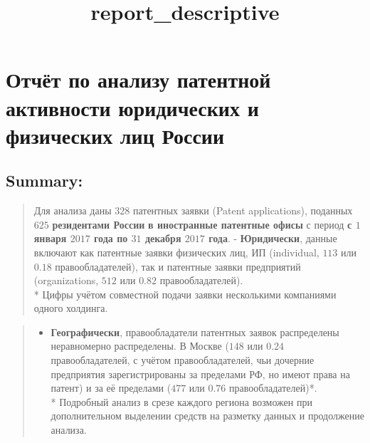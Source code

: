 \documentclass[11pt]{article}
\title{report\_descriptive}
\providecommand{\tightlist}{%
      \setlength{\itemsep}{0pt}\setlength{\parskip}{0pt}}
\begin{document}
    
    
    \maketitle
    
    

    
    \section{Отчёт по анализу патентной активности юридических и физических
лиц
России}\label{ux43eux442ux447ux451ux442-ux43fux43e-ux430ux43dux430ux43bux438ux437ux443-ux43fux430ux442ux435ux43dux442ux43dux43eux439-ux430ux43aux442ux438ux432ux43dux43eux441ux442ux438-ux44eux440ux438ux434ux438ux447ux435ux441ux43aux438ux445-ux438-ux444ux438ux437ux438ux447ux435ux441ux43aux438ux445-ux43bux438ux446-ux440ux43eux441ux441ux438ux438}

    \subsection{Summary:}\label{summary}

    \begin{quote}
Для анализа даны \textbf{\(328\)} патентных заявки (Patent
applications), поданных \(625\) \textbf{резидентами России} \textbf{в
иностранные патентные офисы} с период \textbf{с \(1\) января \(2017\)
года по \(31\) декабря \(2017\) года}. - \textbf{Юридически}, данные
включают как патентные заявки физических лиц, ИП (individual, \(113\)
или \(0.18\) правообладателей), так и патентные заявки предприятий
(organizations, \(512\) или \(0.82\) правообладателей).\\
* Цифры учётом совместной подачи заявки несколькими компаниями одного
холдинга.
\end{quote}

\begin{quote}
\begin{itemize}
\tightlist
\item
  \textbf{Географически}, правообладатели патентных заявок распределены
  неравномерно распределены. В Москве (\(148\) или \(0.24\)
  правообладателей, с учётом правообладателей, чьи дочерние предприятия
  зарегистрированы за пределами РФ, но имеют права на патент) и за её
  пределами (\(477\) или \(0.76\) правообладателей)*.\\
  * Подробный анализ в срезе каждого региона возможен при дополнительном
  выделении средств на разметку данных и продолжение анализа.
\end{itemize}
\end{quote}
\end{document}

